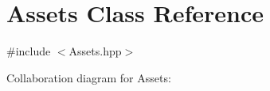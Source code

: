 \hypertarget{class_assets}{}\section{Assets Class Reference}
\label{class_assets}


{\ttfamily \#include $<$Assets.\+hpp$>$}



Collaboration diagram for Assets\+:
